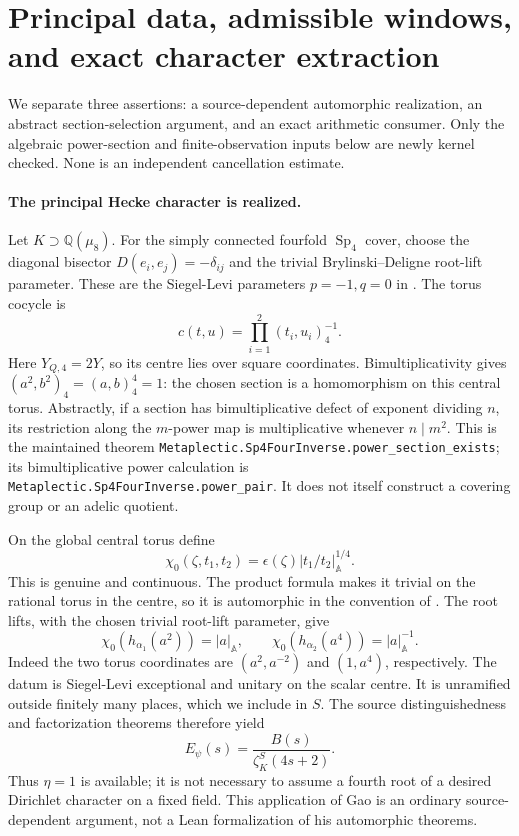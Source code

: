\section{Principal data, admissible windows, and exact character extraction}
\label{sec:sp4-principal-window}

We separate three assertions: a source-dependent automorphic realization,
an abstract section-selection argument, and an exact arithmetic consumer.
Only the algebraic power-section and finite-observation inputs below are
newly kernel checked. None is an independent cancellation estimate.

\paragraph{The principal Hecke character is realized.}
Let \(K\supset\mathbb Q(\mu_8)\). For the simply connected fourfold
\(\operatorname{Sp}_4\) cover, choose the diagonal bisector
\(D(e_i,e_j)=-\delta_{ij}\) and the trivial Brylinski--Deligne
root-lift parameter. These are the Siegel-Levi parameters \(p=-1,q=0\)
in \cite[Section 6]{GaoInverseEis}.
The torus cocycle is
\[
 c(t,u)=\prod_{i=1}^2(t_i,u_i)_4^{-1}.
\]
Here \(Y_{Q,4}=2Y\), so its centre lies over square coordinates.
Bimultiplicativity gives
\((a^2,b^2)_4=(a,b)_4^4=1\): the chosen section is a homomorphism
on this central torus. Abstractly, if a section has bimultiplicative
defect of exponent dividing \(n\), its restriction along the
\(m\)-power map is multiplicative whenever \(n\mid m^2\).
This is the maintained theorem
\texttt{Metaplectic.Sp4FourInverse.power\_section\_exists}; its
bimultiplicative power calculation is
\texttt{Metaplectic.Sp4FourInverse.power\_pair}.
It does not itself construct a covering group or an adelic quotient.

On the global central torus define
\[
 \chi_0(\zeta,t_1,t_2)
   =\epsilon(\zeta)\lvert t_1/t_2\rvert_{\mathbb A}^{1/4}.
\]
This is genuine and continuous. The product formula makes it trivial
on the rational torus in the centre, so it is automorphic in the
convention of \cite[Section 2.6]{GaoInverseEis}.
The root lifts, with the chosen trivial root-lift parameter, give
\[
 \chi_0(h_{\alpha_1}(a^2))=|a|_{\mathbb A},\qquad
 \chi_0(h_{\alpha_2}(a^4))=|a|_{\mathbb A}^{-1}.
\]
Indeed the two torus coordinates are \((a^2,a^{-2})\) and
\((1,a^4)\), respectively. The datum is Siegel-Levi exceptional and
unitary on the scalar centre. It is unramified outside finitely many
places, which we include in \(S\). The source distinguishedness and
factorization theorems therefore yield
\begin{equation}\label{eq:sp4-principal-inverse}
 E_\psi(s)=\frac{B(s)}{\zeta_K^S(4s+2)}.
\end{equation}
Thus \(\eta=1\) is available; it is not necessary to assume a fourth
root of a desired Dirichlet character on a fixed field.
This application of Gao is an ordinary source-dependent argument,
not a Lean formalization of his automorphic theorems.

